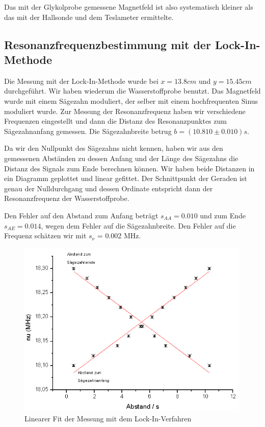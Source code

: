 Das mit der Glykolprobe gemessene Magnetfeld ist also systematisch kleiner als das mit der Hallsonde und dem Teslameter ermittelte. %

\subsection{Resonanzfrequenzbestimmung mit der Lock-In-Methode}

Die Messung mit der Lock-In-Methode wurde bei $x=13.8cm$ und $y=15.45cm$ durchgeführt. Wir haben wiederum die Wasserstoffprobe benutzt. Das Magnetfeld wurde mit einem Sägezahn moduliert, der selber mit einem hochfrequenten Sinus moduliert wurde. Zur Messung der Resonanzfrequenz haben wir verschiedene Frequenzen eingestellt und dann die Distanz des Resonanzpunktes zum Sägezahnanfang gemessen. Die Sägezahnbreite betrug $b = (10.810 \pm 0.010)s$. 

Da wir den Nullpunkt des Sägezahns nicht kennen, haben wir aus den gemessenen Abständen zu dessen Anfang und der Länge des Sägezahns die Distanz des Signals zum Ende berechnen können. Wir haben beide Distanzen in ein Diagramm geplottet und linear gefittet. Der Schnittpunkt der Geraden ist genau der Nulldurchgang und dessen Ordinate entspricht dann der Resonanzfrequenz der Wasserstoffprobe.

Den Fehler auf den Abstand zum Anfang beträgt $s_{AA}=0.010$ und zum Ende $s_{AE}=0.014$, wegen dem Fehler auf die Sägezahnbreite. Den Fehler auf die Frequenz schätzen wir mit $s_\nu$ = 0.002 MHz.

\begin{figure}[H]
\centering \includegraphics[width=0.99\textwidth]{Bilder/linreg.png}
\caption{Linearer Fit der Messung mit dem Lock-In-Verfahren}
\end{figure}

